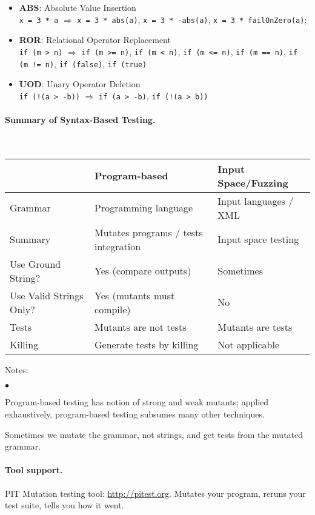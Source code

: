 \documentclass[11pt]{article}
\newcommand{\squishlist}{
 \begin{list}{$\bullet$}
  { \setlength{\itemsep}{0pt}
     \setlength{\parsep}{3pt}
     \setlength{\topsep}{3pt}
     \setlength{\partopsep}{0pt}
     \setlength{\leftmargin}{1.5em}
     \setlength{\labelwidth}{1em}
     \setlength{\labelsep}{0.5em} } }
\newcommand{\squishend}{
  \end{list}  }
\begin{document}
\begin{itemize}
\item {\bf ABS}: Absolute Value Insertion\\
{\tt x = 3 * a}
$\Longrightarrow$ {\tt x = 3 * abs(a)}, {\tt x = 3 * -abs(a)}, {\tt x = 3 * failOnZero(a)};
\item {\bf ROR}: Relational Operator Replacement\\
{\tt if (m > n)} $\Longrightarrow$ {\tt if (m >= n)}, {\tt if (m < n)}, {\tt if (m <= n)}, {\tt if (m == n)}, {\tt if (m != n)}, {\tt if (false)}, {\tt if (true)}
\item {\bf UOD}: Unary Operator Deletion\\
{\tt if (!(a > -b))} $\Longrightarrow$ {\tt if (a > -b)}, {\tt if (!(a > b))}
\end{itemize}


\vspace*{-1em}
\paragraph{Summary of Syntax-Based Testing.}~\\

\begin{tabular}{l|ll}
& Program-based & Input Space/Fuzzing \\ \hline
Grammar & Programming language & Input languages / XML \\
Summary & Mutates programs / tests integration & Input space testing \\
Use Ground String? & Yes (compare outputs) & Sometimes \\
Use Valid Strings Only? & Yes (mutants must compile) & No \\
Tests & Mutants are not tests & Mutants are tests \\
Killing & Generate tests by killing & Not applicable \\
\end{tabular}

Notes: 
\squishlist
\item Program-based testing has notion of strong and weak mutants; applied
exhaustively, program-based testing subsumes many other techniques.
\item Sometimes we mutate the grammar, not strings, and get tests from the
mutated grammar.
\squishend

\paragraph{Tool support.} PIT Mutation testing tool: \url{http://pitest.org}. Mutates
your program, reruns your test suite, tells you how it went.
\end{document}
